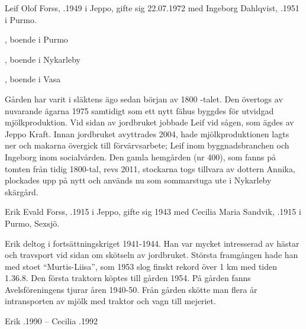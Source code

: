 
Leif Olof Forss, .1949 i Jeppo, gifte sig 22.07.1972 med Ingeborg Dahlqvist, .1951 i Purmo.
\begin{jhchildren}
  \item {}, boende i Purmo
  \item {}, boende i Nykarleby
  \item {}, boende i Vasa
\end{jhchildren}


Gården har varit i släktens ägo sedan början av 1800 -talet. Den övertogs av nuvarande ägarna 1975 samtidigt som ett nytt fähus byggdes för utvidgad mjölkproduktion. Vid sidan av jordbruket jobbade Leif vid sågen, som ägdes av Jeppo Kraft. Innan jordbruket avyttrades 2004, hade mjölkproduktionen lagts ner och makarna övergick till förvärvsarbete; Leif inom byggnadsbranchen och Ingeborg inom socialvården. Den gamla hemgården (nr 400), som fanns på tomten från tidig 1800-tal, revs 2011, stockarna togs tillvara av dottern Annika, plockades upp på nytt och används nu som sommarstuga ute i Nykarleby skärgård.


Erik Evald Forss, .1915 i Jeppo, gifte sig 1943 med Cecilia Maria Sandvik, .1915 i Purmo, Sexsjö.
\begin{jhchildren}
  \item {}
  \item {}
  \item {}
  \item {}
\end{jhchildren}

Erik deltog i fortsättningskriget 1941-1944. Han var mycket intresserad av hästar och travsport vid sidan om skötseln av jordbruket. Största framgången hade han med  stoet ``Murtis-Liisa'', som 1953 slog finskt rekord över 1 km med tiden 1.36.8. Den första traktorn köptes till gården 1954. På gården fanns Avelsföreningens tjurar åren 1940-50. Från gården skötte man flera år intransporten av mjölk med traktor och vagn till mejeriet.

Erik .1990  --  Cecilia .1992


